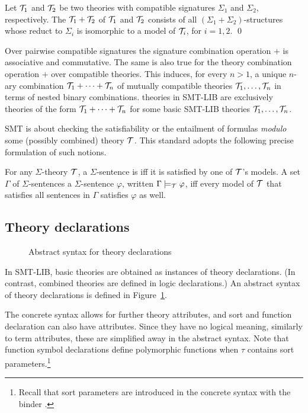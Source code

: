 \begin{definition}
\label{def:theorycomb}
Let $\mathcal{T}_1$ and $\mathcal{T}_2$ be two theories 
with compatible signatures $\Sigma_1$ and $\Sigma_2$, respectively. 
The  $\mathcal{T}_1 + \mathcal{T}_2$ of $\mathcal{T}_1$ and $\mathcal{T}_2$
consists of all $(\Sigma_1+\Sigma_2)$-structures
whose reduct to $\Sigma_i$ is isomorphic to a model of $\mathcal{T}_i$,
for $i=1,2$.
\qed
\end{definition}

Over pairwise compatible signatures
the signature combination operation $+$ is associative and commutative.
The same is also true for the theory combination operation $+$ over
compatible theories.
This induces, for every $n > 1$,
a unique $n$-ary combination $\mathcal{T}_1 + \cdots + \mathcal{T}_n$ 
of mutually compatible theories $\mathcal{T}_1,\ldots,\mathcal{T}_n$
in terms of nested binary combinations.
 theories in SMT-LIB are exclusively
theories of the form $\mathcal{T}_1 + \cdots + \mathcal{T}_n$ 
for some basic SMT-LIB theories $\mathcal{T}_1,\ldots,\mathcal{T}_n$.

SMT is about checking the satisfiability or the entailment 
of formulas \emph{modulo} some (possibly combined) theory $\mathcal{T}$.
This standard adopts the following precise formulation of such notions.

\begin{definition}
For any $\Sigma$-theory $\mathcal{T}$,
a $\Sigma$-sentence is 
iff it is satisfied by one of $\mathcal{T}$'s models.
A set $\Gamma$ of $\Sigma$-sentences
 a $\Sigma$-sentence $\varphi$,
written $\Gamma \models_{\mathcal{T}} \varphi$,
iff every model of $\mathcal{T}$ that satisfies all sentences in $\Gamma$
satisfies $\varphi$ as well.
\end{definition}


\subsection{Theory declarations} \label{sec:theory-decl}

\begin{figure}[t]
\theories
\caption{Abstract syntax for theory declarations}
\label{fig:theory-declaration}
\end{figure}

In SMT-LIB, basic theories are obtained as instances of theory declarations.
(In contrast, combined theories are defined in logic declarations.)
An abstract syntax of theory declarations is defined in 
Figure~\ref{fig:theory-declaration}.
\begin{newver}
The concrete syntax allows for further
theory attributes, and sort and function declaration can also have
attributes.  Since they have no logical meaning, similarly to term attributes,
these are simplified away in the abstract syntax.  Note that function symbol
declarations define polymorphic functions
when $\tau$ contains sort parameters.\footnote{%
Recall that sort parameters are introduced
in the concrete syntax with the binder .
}
\end{newver}

